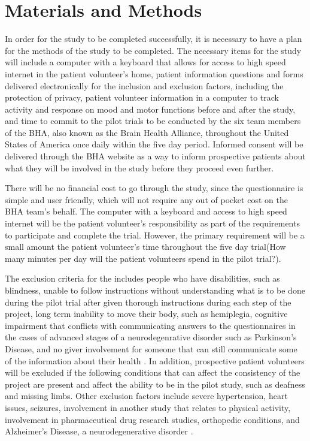 \documentclass[12pt,letterpaper]{article}
\begin{document}
\section{Materials and Methods}
 In order for the study to be completed successfully, it is necessary to have a plan for the methods of the study to be completed. The necessary items for the study will include a computer with a keyboard that allows for access to high speed internet in the patient volunteer's home, patient information questions and forms delivered electronically for the inclusion and exclusion factors, including the protection of privacy, patient volunteer information in a computer to track activity and response on mood and motor functions before and after the study, and time to commit to the pilot trials to be conducted by the six team members of the BHA, also known as the Brain Health Alliance, throughout the United States of America once daily within the five day period. Informed consent will be delivered through the BHA website as a way to inform prospective patients about what they will be involved in the study before they proceed even further. 
 
 There will be no financial cost to go through the study, since the questionnaire is simple and user friendly, which will not require any out of pocket cost on the BHA team's behalf. The computer with a keyboard and access to high speed internet will be the patient volunteer's responsibility as part of the requirements to participate and complete the trial. However, the primary requirement will be a small amount the patient volunteer's  time throughout the five day trial(How many minutes per day will the patient volunteers spend in the pilot trial?).
 
 The exclusion criteria for the  includes people who have disabilities, such as blindness, unable to follow instructions without understanding what is to be done during the pilot trial after given thorough instructions during each step of the project, long term inability to move their body, such as hemiplegia, cognitive impairment that conflicts with communicating answers to the questionnaires in the cases of advanced stages of a neurodegenrative disorder such as Parkinson's Disease, and no giver involvement for someone that can still communicate some of the information about their health \cite{Martinez-Martin2007}. In addition, prospective patient volunteers will be excluded if the following conditions that can affect the consistency of the project are present and affect the ability to be in the pilot study, such as deafness and missing limbs. Other exclusion factors include severe hypertension, heart issues, seizures, involvement in another study that relates to physical activity, involvement in pharmaceutical drug research studies, orthopedic conditions, and Alzheimer's Disease, a neurodegenerative disorder \cite{Pompeua2014}.
 
\end{document}
